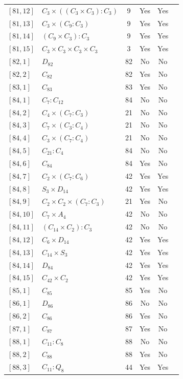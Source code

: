 \documentclass[12pt, a4paper]{article}
\theoremstyle{plain}
\theoremstyle{definition}
\begin{document}
\begin{longtable}{llcccl}
  $[81,12]$ & $C_3 \times ((C_3 \times C_3) : C_3)$ & 9 & Yes & Yes \\
  $[81,13]$ & $C_3 \times (C_9 : C_3)$ & 9 & Yes & Yes \\
  $[81,14]$ & $(C_9 \times C_3) : C_3$ & 9 & Yes & Yes \\
  $[81,15]$ & $C_3 \times C_3 \times C_3 \times C_3$ & 3 & Yes & Yes \\
  $[82,1]$ & $D_{82}$ & 82 & No & No \\
  $[82,2]$ & $C_{82}$ & 82 & Yes & No \\
  $[83,1]$ & $C_{83}$ & 83 & Yes & No \\
  $[84,1]$ & $C_7 : C_{12}$ & 84 & No & No \\
  $[84,2]$ & $C_4 \times (C_7 : C_3)$ & 21 & No & No \\
  $[84,3]$ & $C_7 \times (C_3 : C_4)$ & 21 & No & No \\
  $[84,4]$ & $C_3 \times (C_7 : C_4)$ & 21 & No & No \\
  $[84,5]$ & $C_{21} : C_4$ & 84 & No & No \\
  $[84,6]$ & $C_{84}$ & 84 & Yes & No \\
  $[84,7]$ & $C_2 \times (C_7 : C_6)$ & 42 & Yes & Yes \\
  $[84,8]$ & $S_3 \times D_{14}$ & 42 & Yes & Yes \\
  $[84,9]$ & $C_2 \times C_2 \times (C_7 : C_3)$ & 21 & Yes & No \\
  $[84,10]$ & $C_7 \times A_4$ & 42 & No & No \\
  $[84,11]$ & $(C_{14} \times C_2) : C_3$ & 42 & No & No \\
  $[84,12]$ & $C_6 \times D_{14}$ & 42 & Yes & Yes \\
  $[84,13]$ & $C_{14} \times S_3$ & 42 & Yes & Yes \\
  $[84,14]$ & $D_{84}$ & 42 & Yes & Yes \\
  $[84,15]$ & $C_{42} \times C_2$ & 42 & Yes & Yes \\
  $[85,1]$ & $C_{85}$ & 85 & Yes & No \\
  $[86,1]$ & $D_{86}$ & 86 & No & No \\
  $[86,2]$ & $C_{86}$ & 86 & Yes & No \\
  $[87,1]$ & $C_{87}$ & 87 & Yes & No \\
  $[88,1]$ & $C_{11} : C_8$ & 88 & No & No \\
  $[88,2]$ & $C_{88}$ & 88 & Yes & No \\
  $[88,3]$ & $C_{11} : Q_8$ & 44 & Yes & Yes \\

\end{longtable}
\end{document}
